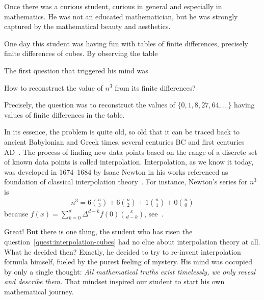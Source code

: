 Once there was a curious student, curious in general and especially in mathematics.
He was not an educated mathematician, but he was strongly captured by the mathematical
beauty and aesthetics.

One day this student was having fun with tables of finite differences, precisely finite differences of cubes.
By observing the table

The first question that triggered his mind was
\begin{question}
    \label{quest:interpolation-cubes}
    How to reconstruct the value of $n^3$ from its finite differences?
\end{question}
Precisely, the question was to reconstruct the values of $\{0, 1, 8, 27, 64, \ldots\}$
having values of finite differences in the table.

In its essence, the problem is quite old, so old that it can be traced back to ancient Babylonian and Greek times,
several centuries BC and first centuries AD~\cite{gautschi2012interpolation}.
The process of finding new data points based on the range of a discrete set
of known data points is called interpolation.
Interpolation, as we know it today, was developed in 1674--1684 by Isaac Newton
in his works referenced as foundation of classical interpolation theory~\cite{meijering2002chronology}.
For instance, Newton's series for $n^3$ is
\begin{align*}
    n^3 = 6 \binom{n}{3} + 6\binom{n}{2} + 1 \binom{n}{1} + 0\binom{n}{0}
\end{align*}
because $f(x) = \sum_{k=0}^{d} \Delta^{d-k} f(0) \binom{x}{d-k}$, see~\cite[~p. 190]{graham1994concrete}.

Great!
But there is one thing, the student who has risen the question~\eqref{quest:interpolation-cubes}
had no clue about interpolation theory at all.
What he decided then?
Exactly, he decided to try to re-invent interpolation formula himself,
fueled by the purest feeling of mystery.
His mind was occupied by only a single thought:
\textit{
    All mathematical truths exist timelessly, we only reveal and describe them.
}
That mindset inspired our student to start his own mathematical journey.

